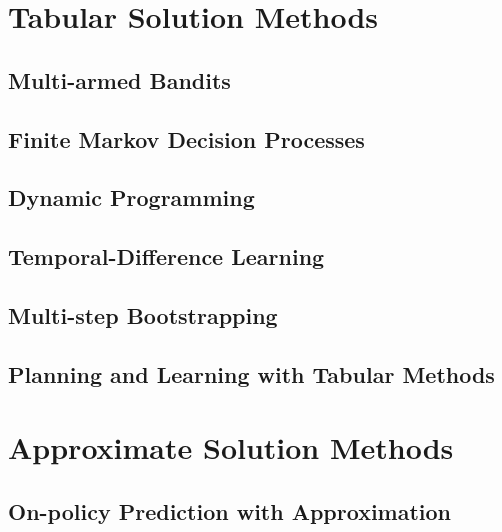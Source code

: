 \documentclass[a4paper,chapter,microtype,fleqn]{oblivoir}
\begin{document}
\tableofcontents



\part{Tabular Solution Methods}\label{pt:tabular-solution-methods}

\chapter{Multi-armed Bandits}\label{ch:multi-armed-bandits}
\label{varying-step-size-parameter}

\chapter{Finite Markov Decision Processes}\label{ch:finite-markov-decision-processes}

\chapter{Dynamic Programming}\label{ch:dynamic-programming}



\chapter{Temporal-Difference Learning}\label{ch:temporal-difference-learning}

\chapter{Multi-step Bootstrapping}\label{ch:multi-step-bootstrapping}

\chapter{Planning and Learning with Tabular Methods}\label{ch:planning-and-learning-with-tabular-methods}

\part{Approximate Solution Methods}\label{ch:approximate-solution-methods}

\chapter{On-policy Prediction with Approximation}\label{ch:on-policy-prediction-with-approximation}
\end{document}
